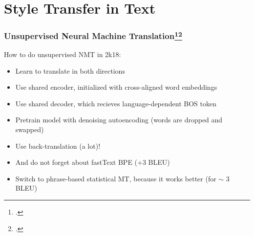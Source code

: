 \documentclass[10pt]{beamer}
\begin{document}
\section{Style Transfer in Text}


\begin{frame}
\frametitle{Unsupervised Neural Machine Translation\footcite{UnsupervisedMT}\footcite{PhraseBasedUNMT}}
How to do unsupervised NMT in 2k18:
\begin{itemize}
    \item Learn to translate in both directions
    \item Use shared encoder, initialized with cross-aligned word embeddings
    \item Use shared decoder, which recieves language-dependent BOS token
    \item Pretrain model with denoising autoencoding (words are dropped and swapped)
    \item Use back-translation (a lot)!
    \item And do not forget about fastText BPE (+3 BLEU)
    \item Switch to phrase-based statistical MT, because it works better (for  $\sim$ 3 BLEU)
\end{itemize}

\end{frame}


%
%
\end{document}
